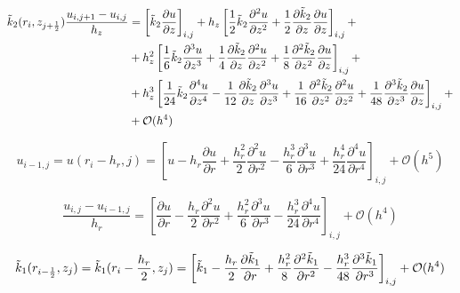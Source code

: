 \begin{align*}
  \Tilde{k}_2(r_i, z_{j+\frac{1}{2}}) \frac{u_{i, j + 1} - u_{i, j}}{h_z} &= 
  \left[ \Tilde{k}_2 \frac{\partial u}{\partial z} \right]_{i, j}
  + h_z \left[
  \frac{1}{2} \Tilde{k}_2 \frac{\partial^2 u}{\partial z^2}
  + \frac{1}{2} \frac{\partial \Tilde{k}_2}{\partial z} \frac{\partial u}{\partial z}
  \right]_{i, j} +\\
  &+ h^2_z \left[
    \frac{1}{6} \Tilde{k}_2 \frac{\partial^3 u}{\partial z^3}
    + \frac{1}{4} \frac{\partial \Tilde{k}_2}{\partial z} \frac{\partial^2 u}{\partial z^2}
    + \frac{1}{8} \frac{\partial^2 \Tilde{k}_2}{\partial z^2} \frac{\partial u}{\partial z}
  \right]_{i, j} +\\
  &+ h^3_z \left[
   \frac{1}{24} \Tilde{k}_2 \frac{\partial^4 u}{\partial z^4} - \frac{1}{12} \frac{\partial \Tilde{k}_2}{\partial z} \frac{\partial^3 u}{\partial z^3}
  + \frac{1}{16} \frac{\partial^2 \Tilde{k}_2}{\partial z^2} \frac{\partial^2 u}{\partial z^2}
  + \frac{1}{48} \frac{\partial^3 \Tilde{k}_2}{\partial z^3} \frac{\partial u}{\partial z}
   \right]_{i, j} +\\
  &+ \mathcal{O}(h^4)
\end{align*}

\[
  u_{i - 1, j} = u(r_i - h_r, j) = \left[
    u - h_r \frac{\partial u}{\partial r} + \frac{h^2_r}{2}\frac{\partial^2 u}{\partial r^2}
    - \frac{h^3_r}{6}\frac{\partial^3 u}{\partial r^3} + \frac{h^4_r}{24}\frac{\partial^4 u}{\partial r^4}
  \right]_{i,j}
  + \mathcal{O}(h^5)
\]

\[
  \frac{u_{i,j} - u_{i - 1, j}}{h_r} = 
  \left[
    \frac{\partial u}{\partial r} - \frac{h_r}{2}\frac{\partial^2 u}{\partial r^2}
    + \frac{h^2_r}{6}\frac{\partial^3 u}{\partial r^3} - \frac{h^3_r}{24}\frac{\partial^4 u}{\partial r^4}
  \right]_{i,j}
  + \mathcal{O}(h^4)
\]

\[
  \Tilde{k}_1 (r_{i - \frac{1}{2}}, z_j) = \Tilde{k}_1(r_i - \frac{h_r}{2}, z_j) =
  \left[
    \Tilde{k}_1 - \frac{h_r}{2}\frac{\partial \Tilde{k}_1}{\partial r}
  + \frac{h^2_r}{8}\frac{\partial^2 \Tilde{k}_1}{\partial r^2}
  - \frac{h^3_r}{48}\frac{\partial^3 \Tilde{k}_1}{\partial r^3}
  \right]_{i,j} + \mathcal{O}(h^4)
\]

